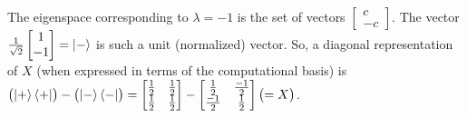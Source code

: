 The eigenspace corresponding to $\lambda = -1$ is the set of vectors $\begin{bmatrix}c \\ -c\end{bmatrix}$.  The vector $\frac{1}{\sqrt{2}}\begin{bmatrix} 1 \\ -1\end{bmatrix} = \ket{-}$ is such a unit (normalized) vector.  So, a diagonal representation of $X$ (when expressed in terms of the computational basis) is $\bigl(\ket{+}\bra{+}\bigr)-\bigl(\ket{-}\bra{-}\bigr) = \begin{bmatrix}\frac{1}{2} & \frac{1}{2} \\ \frac{1}{2} & \frac{1}{2}\end{bmatrix} - \begin{bmatrix} \frac{1}{2} & \frac{-1}{2} \\ \frac{-1}{2} & \frac{1}{2}\end{bmatrix} \bigl( = X\bigr)$.

